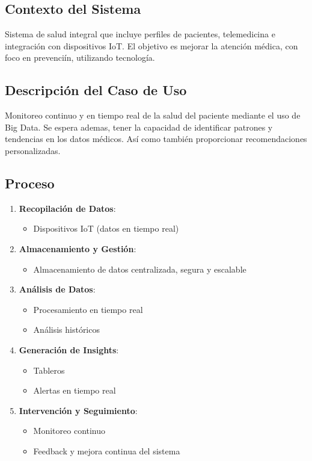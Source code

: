 \subsection{Contexto del Sistema}
Sistema de salud integral que incluye perfiles de pacientes, telemedicina e integración con dispositivos IoT. El objetivo es mejorar la atención médica, con foco en prevenciín, utilizando tecnología.

\subsection{Descripción del Caso de Uso}
Monitoreo continuo y en tiempo real de la salud del paciente mediante el uso de Big Data. Se espera ademas, tener la capacidad de identificar patrones y tendencias en los datos médicos. Así como también proporcionar recomendaciones personalizadas.

\subsection{Proceso}
\begin{enumerate}
    \item \textbf{Recopilación de Datos}:
    \begin{itemize}
        \item Dispositivos IoT (datos en tiempo real)
    \end{itemize}
    
    \item \textbf{Almacenamiento y Gestión}:
    \begin{itemize}
        \item Almacenamiento de datos centralizada, segura y escalable
    \end{itemize}
    
    \item \textbf{Análisis de Datos}:
    \begin{itemize}
        \item Procesamiento en tiempo real
        \item Análisis históricos
    \end{itemize}
    
    \item \textbf{Generación de Insights}:
    \begin{itemize}
        \item Tableros
        \item Alertas en tiempo real
    \end{itemize}
    
    \item \textbf{Intervención y Seguimiento}:
    \begin{itemize}
        \item Monitoreo continuo
        \item Feedback y mejora continua del sistema
    \end{itemize}
\end{enumerate}
